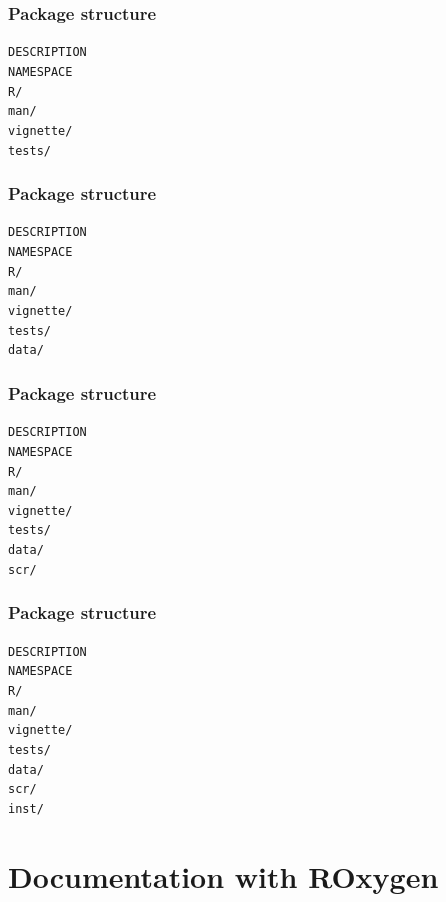 \documentclass{beamer}
\begin{document}
\begin{frame}
	\frametitle{Package structure}
	\texttt{DESCRIPTION} \\
	\texttt{NAMESPACE} \\
	\texttt{R/} \\
	\texttt{man/} \\
	\texttt{vignette/} \\
	\texttt{tests/} 
\end{frame}

\begin{frame}
	\frametitle{Package structure}
	\texttt{DESCRIPTION} \\
	\texttt{NAMESPACE} \\
	\texttt{R/} \\
	\texttt{man/} \\
	\texttt{vignette/} \\
	\texttt{tests/} \\
	\texttt{data/} 
\end{frame}

\begin{frame}
	\frametitle{Package structure}
	\texttt{DESCRIPTION} \\
	\texttt{NAMESPACE} \\
	\texttt{R/} \\
	\texttt{man/} \\
	\texttt{vignette/} \\
	\texttt{tests/} \\
	\texttt{data/} \\
	\texttt{scr/} 
\end{frame}

\begin{frame}
	\frametitle{Package structure}
	\texttt{DESCRIPTION} \\
	\texttt{NAMESPACE} \\
	\texttt{R/} \\
	\texttt{man/} \\
	\texttt{vignette/} \\
	\texttt{tests/} \\
	\texttt{data/} \\
	\texttt{scr/} \\
	\texttt{inst/} 
\end{frame}

\section{Documentation with ROxygen} 
\end{document}
